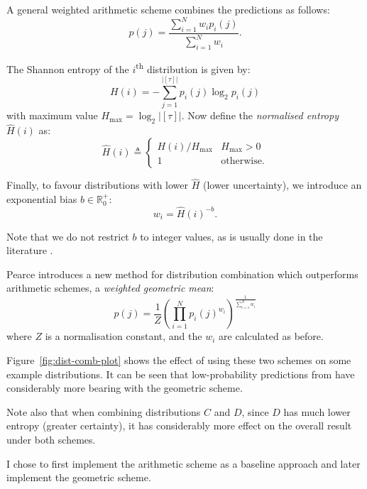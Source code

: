 \documentclass[12pt,a4paper,twoside,openright]{report}
\begin{document}
A general weighted arithmetic scheme combines the predictions as follows:
$$
  p(j) = \frac{ \sum_{i = 1}^N w_i p_i(j) }{ \sum_{i = 1}^N w_i }.
$$

The Shannon entropy of the $i$\textsuperscript{th} distribution is given by:
$$ H(i) = - \sum_{j = 1}^{|[\tau]|} p_i(j) \log_2 p_i(j) $$
with maximum value $H_{\mathrm{max}} = \log_2{ |[\tau]| }$. Now define the
\emph{normalised entropy} $\hat{H}(i)$ as:
$$ \hat{H}(i) \triangleq \begin{cases}
  H(i)/H_{\mathrm{max}} & H_{\mathrm{max}} > 0 \\
  1 & \text{otherwise.}
\end{cases} $$

Finally, to favour distributions with lower $\hat{H}$ (lower uncertainty), we
introduce an exponential bias $b \in \mathbb{R}_0^+$: $$ w_i = \hat{H}(i)^{-b}.
$$

Note that we do not restrict $b$ to integer values, as is usually done in the
literature \cite{whorley2013phd}. 

Pearce \cite{pearce2004improved} introduces a new method for distribution
combination which outperforms arithmetic schemes, a \emph{weighted geometric
mean}:
$$ p(j) = \frac{1}{Z} \left( \prod_{i = 1}^N p_i(j)^{w_i} \right)^{ \frac{1}{
\sum_{i = 1}^N w_i }} $$
where $Z$ is a normalisation constant, and the $w_i$ are calculated as before.

Figure~\ref{fig:dist-comb-plot} shows the effect of using these two schemes on
some example distributions. It can be seen that low-probability predictions from
have considerably more bearing with the geometric scheme.

Note also that when combining distributions $C$ and $D$, since $D$ has much
lower entropy (greater certainty), it has considerably more effect on the
overall result under both schemes.

I chose to first implement the arithmetic scheme as a baseline approach and
later implement the geometric scheme.
\end{document}
